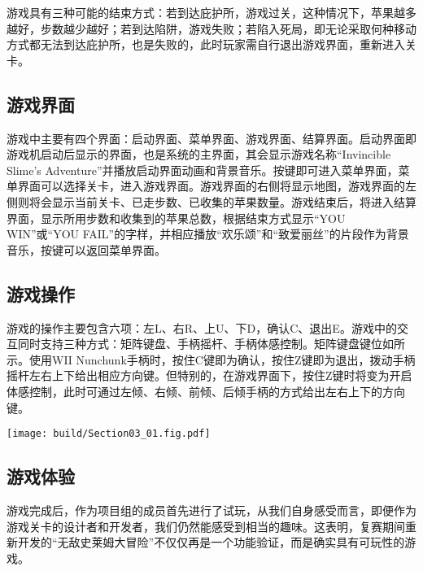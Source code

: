游戏具有三种可能的结束方式：若到达庇护所，游戏过关，这种情况下，苹果越多越好，步数越少越好；若到达陷阱，游戏失败；若陷入死局，即无论采取何种移动方式都无法到达庇护所，也是失败的，此时玩家需自行退出游戏界面，重新进入关卡。

\subsection{游戏界面}
游戏中主要有四个界面：启动界面、菜单界面、游戏界面、结算界面。启动界面即游戏机启动后显示的界面，也是系统的主界面，其会显示游戏名称“Invincible Slime's Adventure”并播放启动界面动画和背景音乐。按键即可进入菜单界面，菜单界面可以选择关卡，进入游戏界面。游戏界面的右侧将显示地图，游戏界面的左侧则将会显示当前关卡、已走步数、已收集的苹果数量。游戏结束后，将进入结算界面，显示所用步数和收集到的苹果总数，根据结束方式显示“YOU WIN”或“YOU FAIL”的字样，并相应播放“欢乐颂”和“致爱丽丝”的片段作为背景音乐，按键可以返回菜单界面。



\subsection{游戏操作}
游戏的操作主要包含六项：左L、右R、上U、下D，确认C、退出E。游戏中的交互同时支持三种方式：矩阵键盘、手柄摇杆、手柄体感控制。矩阵键盘键位如所示。使用WII Nunchunk手柄时，按住C键即为确认，按住Z键即为退出，拨动手柄摇杆左右上下给出相应方向键。但特别的，在游戏界面下，按住Z键时将变为开启体感控制，此时可通过左倾、右倾、前倾、后倾手柄的方式给出左右上下的方向键。

\begin{Figure}[键盘操作]
    \texttt{[image: build/Section03\_01.fig.pdf]}
\end{Figure}



\subsection{游戏体验}
游戏完成后，作为项目组的成员首先进行了试玩，从我们自身感受而言，即便作为游戏关卡的设计者和开发者，我们仍然能感受到相当的趣味。这表明，复赛期间重新开发的“无敌史莱姆大冒险”不仅仅再是一个功能验证，而是确实具有可玩性的游戏。


